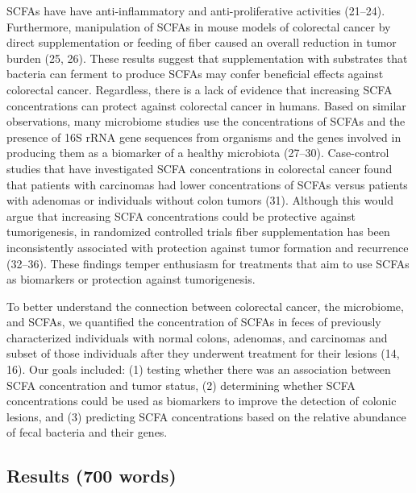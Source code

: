 \documentclass[11pt,]{article}
\begin{document}
SCFAs have have anti-inflammatory and anti-proliferative activities
(21--24). Furthermore, manipulation of SCFAs in mouse models of
colorectal cancer by direct supplementation or feeding of fiber caused
an overall reduction in tumor burden (25, 26). These results suggest
that supplementation with substrates that bacteria can ferment to
produce SCFAs may confer beneficial effects against colorectal cancer.
Regardless, there is a lack of evidence that increasing SCFA
concentrations can protect against colorectal cancer in humans. Based on
similar observations, many microbiome studies use the concentrations of
SCFAs and the presence of 16S rRNA gene sequences from organisms and the
genes involved in producing them as a biomarker of a healthy microbiota
(27--30). Case-control studies that have investigated SCFA
concentrations in colorectal cancer found that patients with carcinomas
had lower concentrations of SCFAs versus patients with adenomas or
individuals without colon tumors (31). Although this would argue that
increasing SCFA concentrations could be protective against
tumorigenesis, in randomized controlled trials fiber supplementation has
been inconsistently associated with protection against tumor formation
and recurrence (32--36). These findings temper enthusiasm for treatments
that aim to use SCFAs as biomarkers or protection against tumorigenesis.

To better understand the connection between colorectal cancer, the
microbiome, and SCFAs, we quantified the concentration of SCFAs in feces
of previously characterized individuals with normal colons, adenomas,
and carcinomas and subset of those individuals after they underwent
treatment for their lesions (14, 16). Our goals included: (1) testing
whether there was an association between SCFA concentration and tumor
status, (2) determining whether SCFA concentrations could be used as
biomarkers to improve the detection of colonic lesions, and (3)
predicting SCFA concentrations based on the relative abundance of fecal
bacteria and their genes.

\newpage

\hypertarget{results-700-words}{%
\subsection{Results (700 words)}\label{results-700-words}}
\end{document}
